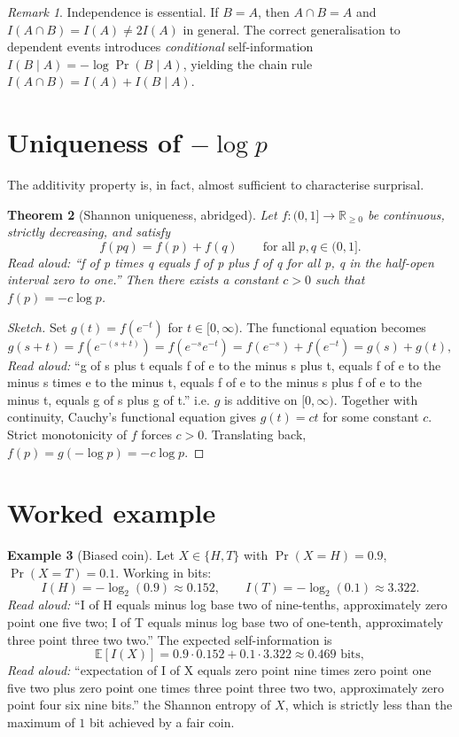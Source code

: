 \documentclass[11pt]{article}
\newtheorem{theorem}{Theorem}
\theoremstyle{definition}
\newtheorem{example}[theorem]{Example}
\theoremstyle{remark}
\newtheorem{remark}[theorem]{Remark}
\begin{document}
\begin{remark}
Independence is essential. If $B = A$, then $A \cap B = A$ and
$I(A \cap B) = I(A) \neq 2 I(A)$ in general. The correct
generalisation to dependent events introduces \emph{conditional}
self-information $I(B \mid A) = -\log \Pr(B \mid A)$, yielding the chain
rule $I(A \cap B) = I(A) + I(B \mid A)$.
\end{remark}

\section{Uniqueness of \texorpdfstring{$-\log p$}{-log p}}

The additivity property is, in fact, almost sufficient to characterise
surprisal.

\begin{theorem}[Shannon uniqueness, abridged]\label{thm:uniqueness}
Let $f : (0, 1] \to \mathbb{R}_{\ge 0}$ be continuous, strictly decreasing,
and satisfy
\[
  f(pq) = f(p) + f(q) \qquad \text{for all } p, q \in (0,1].
\]
\emph{Read aloud:} ``f of p times q equals f of p plus f of q for all p, q in the half-open interval zero to one.''
Then there exists a constant $c > 0$ such that $f(p) = -c \log p$.
\end{theorem}

\begin{proof}[Sketch]
Set $g(t) = f(e^{-t})$ for $t \in [0, \infty)$. The functional equation
becomes
\[
  g(s + t) = f(e^{-(s+t)}) = f(e^{-s} e^{-t})
           = f(e^{-s}) + f(e^{-t}) = g(s) + g(t),
\]
\emph{Read aloud:} ``g of s plus t equals f of e to the minus s plus t, equals f of e to the minus s times e to the minus t, equals f of e to the minus s plus f of e to the minus t, equals g of s plus g of t.''
i.e. $g$ is additive on $[0, \infty)$. Together with continuity, Cauchy's
functional equation gives $g(t) = c t$ for some constant $c$. Strict
monotonicity of $f$ forces $c > 0$. Translating back,
$f(p) = g(-\log p) = -c \log p$.
\end{proof}

\section{Worked example}

\begin{example}[Biased coin]
Let $X \in \{H, T\}$ with $\Pr(X = H) = 0.9$, $\Pr(X = T) = 0.1$. Working
in bits:
\[
  I(H) = -\log_2(0.9) \approx 0.152, \qquad
  I(T) = -\log_2(0.1) \approx 3.322.
\]
\emph{Read aloud:} ``I of H equals minus log base two of nine-tenths, approximately zero point one five two; I of T equals minus log base two of one-tenth, approximately three point three two two.''
The expected self-information is
\[
  \mathbb{E}[I(X)] = 0.9 \cdot 0.152 + 0.1 \cdot 3.322 \approx 0.469 \text{ bits},
\]
\emph{Read aloud:} ``expectation of I of X equals zero point nine times zero point one five two plus zero point one times three point three two two, approximately zero point four six nine bits.''
the Shannon entropy of $X$, which is strictly less than the maximum of $1$ bit
achieved by a fair coin.
\end{example}
\end{document}
